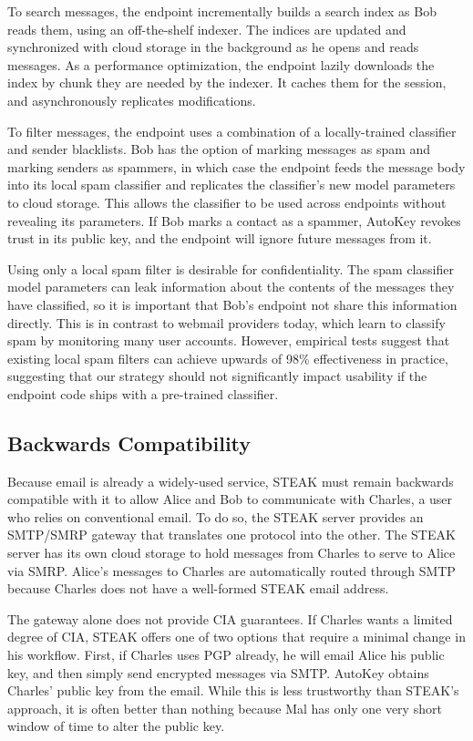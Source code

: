 To search messages, the endpoint incrementally builds a search index as Bob reads them, using an off-the-shelf indexer.  The indices are updated and synchronized with cloud storage in the background as he opens and reads messages.  As a performance optimization, the endpoint lazily downloads the index by chunk they are needed by the indexer.  It caches them for the session, and asynchronously replicates modifications.

To filter messages, the endpoint uses a combination of a locally-trained classifier and sender blacklists.  Bob has the option of marking messages as spam and marking senders as spammers, in which case the endpoint feeds the message body into its local spam classifier and replicates the classifier’s new model parameters to cloud storage.  This allows the classifier to be used across endpoints without revealing its parameters.  If Bob marks a contact as a spammer, AutoKey revokes trust in its public key, and the endpoint will ignore future messages from it.

Using only a local spam filter is desirable for confidentiality.  The spam classifier model parameters can leak information about the contents of the messages they have classified, so it is important that Bob’s endpoint not share this information directly.  This is in contrast to webmail providers today, which learn to classify spam by monitoring many user accounts.  However, empirical tests suggest that existing local spam filters can achieve upwards of 98\% effectiveness in practice, suggesting that our strategy should not significantly impact usability if the endpoint code ships with a pre-trained classifier.

\subsection{Backwards Compatibility}
Because email is already a widely-used service, STEAK must remain backwards compatible with it to allow Alice and Bob to communicate with Charles, a user who relies on conventional email.  To do so, the STEAK server provides an SMTP/SMRP gateway that translates one protocol into the other.  The STEAK server has its own cloud storage to hold messages from Charles to serve to Alice via SMRP.  Alice’s messages to Charles are automatically routed through SMTP because Charles does not have a well-formed STEAK email address.

The gateway alone does not provide CIA guarantees.  If Charles wants a limited degree of CIA, STEAK offers one of two options that require a minimal change in his workflow.  First, if Charles uses PGP already, he will email Alice his public key, and then simply send encrypted messages via SMTP.  AutoKey obtains Charles’ public key from the email.  While this is less trustworthy than STEAK’s approach, it is often better than nothing because Mal has only one very short window of time to alter the public key.

